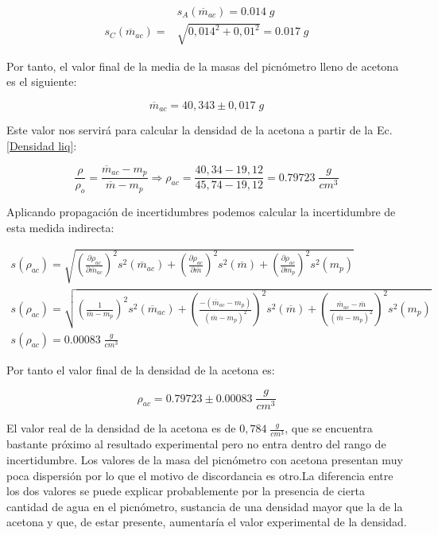 \documentclass[a4paper,12pt,titlepage]{article}
\begin{document}
\begin{align}
    &s_{A}(\overline{m}_{ac}) = 0.014 \; g \\
    s_{C}(\overline{m}_{ac}) = &\sqrt{0,014^2 + 0,01^2} = 0.017 \; g
\end{align}

Por tanto, el valor final de la media de la masas del picnómetro lleno de acetona es el siguiente:

\begin{equation}
    \overline{m}_{ac} = 40,343 \pm 0,017 \; g
\end{equation}

Este valor nos servirá para calcular la densidad de la acetona a partir de la Ec.\ref{Densidad liq}:

\begin{equation}
    \frac{\rho}{\rho_o}=\frac{\overline{m}_{ac}-m_{p}}{\overline{m}-m_{p}} \Rightarrow \rho_{ac} = \frac{40,34-19,12}{45,74-19,12} = 0.79723 \; \frac{g}{cm^3}
\end{equation}

Aplicando propagación de incertidumbres podemos calcular la incertidumbre de esta medida indirecta:

\begin{gather}
    s(\rho_{ac}) = \sqrt{\left (\frac{\partial \rho_{ac}}{\partial \overline{m}_{ac}} \right )^2 s^2(\overline{m}_{ac})  +  \left (\frac{\partial \rho_{ac}}{\partial \overline{m}} \right )^2 s^2(\overline{m})  +  \left (\frac{\partial \rho_{ac}}{\partial m_{p}} \right )^2 s^2(m_{p})} \\
    s(\rho_{ac}) = \sqrt{\left (\frac{1}{\overline{m}-m_{p}} \right )^2 s^2(\overline{m}_{ac})  +  \left (\frac{-(\overline{m}_{ac}-m_{p})}{(\overline{m}-m_{p})^2} \right )^2 s^2(\overline{m})  +  \left (\frac{\overline{m}_{ac}-\overline{m}}{(\overline{m}-m_{p})^2} \right )^2 s^2(m_{p})} \nonumber  \\
    s(\rho_{ac}) = 0.00083 \; \frac{g}{cm^3} \nonumber
    \label{Inceridumbre densidad liq}
\end{gather}

Por tanto el valor final de la densidad de la acetona es:

\begin{equation}
    \rho_{ac} = 0.79723 \pm 0.00083 \; \frac{g}{cm^3}
\end{equation}

El valor real de la densidad de la acetona es de $0,784 \; \frac{g}{cm^3}$, que se encuentra bastante próximo al resultado experimental pero no entra dentro del rango de incertidumbre. Los valores de la masa del picnómetro con acetona presentan muy poca dispersión por lo que el motivo de discordancia es otro.La diferencia entre los dos valores se puede explicar probablemente por la presencia de cierta cantidad de agua en el picnómetro, sustancia de una densidad mayor que la de la acetona y que, de estar presente, aumentaría el valor experimental de la densidad. 
\end{document}

